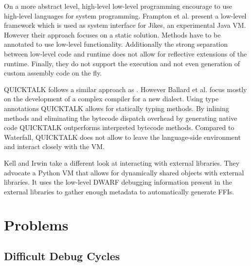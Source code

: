 On a more abstract level, high-level low-level programming \cite{Fram09a} encourage to use high-level languages for system programming.
Frampton et al. present a low-level framework  which is used as system interface for Jikes, an experimental Java VM.
However their approach focuses on a static solution.
Methods have to be annotated to use low-level functionality.
Additionally the strong separation between low-level code and runtime does not allow for reflective extensions of the runtime.
Finally, they do not support the execution and not even generation of custom assembly code on the fly.


QUICKTALK \cite{Ball86a} follows a similar approach as \NB.
However Ballard et al. focus mostly on the development of a complex compiler for a new \ST dialect.
Using type annotations QUICKTALK allows for statically typing methods.
By inlining methods and eliminating the bytecode dispatch overhead by generating native code QUICKTALK outperforms interpreted bytecode methods.
Compared to Waterfall, QUICKTALK does not allow to leave the language-side environment and interact closely with the VM.


Kell and Irwin \cite{Kell11a} take a different look at interacting with external libraries.
They advocate a Python VM that allows for dynamically shared objects with external libraries.
It uses the low-level DWARF debugging information present in the external libraries to gather enough metadata to automatically generate FFIs.

\section{Problems}


\subsection{Difficult Debug Cycles}


